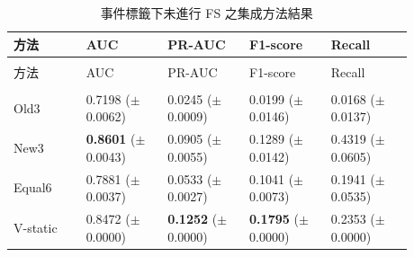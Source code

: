 \begingroup
\small{}\setlength{\tabcolsep}{3pt}
\setlength{\LTleft}{\fill}\setlength{\LTright}{\fill}
\begin{longtable}{@{}>{\raggedright\arraybackslash}p{0.16\linewidth}>{\raggedright\arraybackslash}p{0.18\linewidth}>{\raggedright\arraybackslash}p{0.18\linewidth}>{\raggedright\arraybackslash}p{0.18\linewidth}>{\raggedright\arraybackslash}p{0.18\linewidth}@{}}
\caption{事件標籤下未進行 FS 之集成方法結果}\label{tab:results-ensemble}\\
\toprule
方法 & AUC & PR-AUC & F1-score & Recall \\
\midrule\endfirsthead
\multicolumn{5}{c}{表~\thetable（續）}\\
\toprule
方法 & AUC & PR-AUC & F1-score & Recall \\
\midrule\endhead
\midrule\multicolumn{5}{r}{續下頁}\\\endfoot
\bottomrule\endlastfoot
Old3 & \shortstack[l]{0.7198\\{\scriptsize(\(\pm\)0.0062)}} & \shortstack[l]{0.0245\\{\scriptsize(\(\pm\)0.0009)}} & \shortstack[l]{0.0199\\{\scriptsize(\(\pm\)0.0146)}} & \shortstack[l]{0.0168\\{\scriptsize(\(\pm\)0.0137)}} \\
New3 & \shortstack[l]{\textbf{0.8601}\\{\scriptsize(\(\pm\)0.0043)}} & \shortstack[l]{0.0905\\{\scriptsize(\(\pm\)0.0055)}} & \shortstack[l]{0.1289\\{\scriptsize(\(\pm\)0.0142)}} & \shortstack[l]{0.4319\\{\scriptsize(\(\pm\)0.0605)}} \\
Equal6 & \shortstack[l]{0.7881\\{\scriptsize(\(\pm\)0.0037)}} & \shortstack[l]{0.0533\\{\scriptsize(\(\pm\)0.0027)}} & \shortstack[l]{0.1041\\{\scriptsize(\(\pm\)0.0073)}} & \shortstack[l]{0.1941\\{\scriptsize(\(\pm\)0.0535)}} \\
V-static & \shortstack[l]{0.8472\\{\scriptsize(\(\pm\)0.0000)}} & \shortstack[l]{\textbf{0.1252}\\{\scriptsize(\(\pm\)0.0000)}} & \shortstack[l]{\textbf{0.1795}\\{\scriptsize(\(\pm\)0.0000)}} & \shortstack[l]{0.2353\\{\scriptsize(\(\pm\)0.0000)}} \\

\end{longtable}
